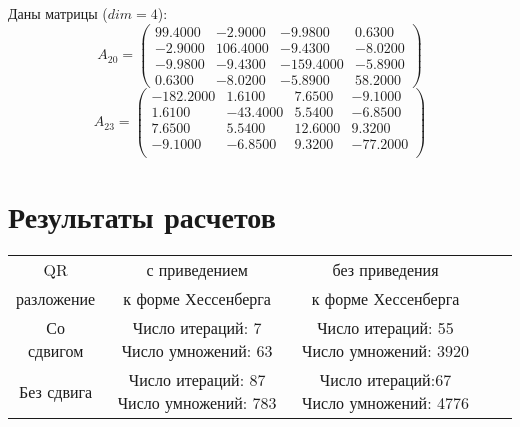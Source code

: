 \documentclass[12pt, a4paper]{article}
\begin{document}
    Даны матрицы ($dim = 4$):
    \[
        A_{20} = 
        \begin{pmatrix}
            99.4000  &   -2.9000  &   -9.9800   &   0.6300  \\  
            -2.9000  &  106.4000  &   -9.4300   &  -8.0200  \\  
            -9.9800  &   -9.4300  & -159.4000   &  -5.8900  \\  
             0.6300  &   -8.0200  &   -5.8900   &  58.2000  
        \end{pmatrix}
    \]
    \[
        A_{23} = 
        \begin{pmatrix}
            -182.2000  &    1.6100   &   7.6500  &   -9.1000  \\
               1.6100  &  -43.4000   &   5.5400  &   -6.8500  \\
               7.6500  &    5.5400   &  12.6000  &    9.3200  \\
              -9.1000  &   -6.8500   &   9.3200  &  -77.2000  \\
        \end{pmatrix}
    \]
    \newpage

    \section{Результаты расчетов}

\noindent\begin{center}%
\hspace*{-25mm}\begin{tabular}{|c|c|c|c|c|}
\hline
QR&с приведением& без приведения\\

разложение&к форме Хессенберга& к форме Хессенберга\\
\hline
Со сдвигом&Число итераций: 7  Число умножений: 63& Число итераций: 55 Число умножений: 3920 \\
\hline
Без сдвига&Число итераций: 87  Число умножений: 783& Число итераций:67  Число умножений: 4776\\
\hline

\end{tabular}
\end{center}
\end{document}
